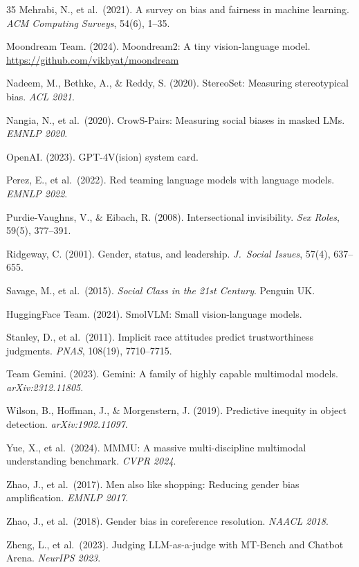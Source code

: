 \documentclass{article}
\begin{document}
\begin{thebibliography}{35}
Mehrabi, N., et al.\ (2021).
A survey on bias and fairness in machine learning.
\textit{ACM Computing Surveys}, 54(6), 1--35.

Moondream Team. (2024).
Moondream2: A tiny vision-language model.
\url{https://github.com/vikhyat/moondream}

Nadeem, M., Bethke, A., \& Reddy, S. (2020).
StereoSet: Measuring stereotypical bias.
\textit{ACL 2021}.

Nangia, N., et al.\ (2020).
CrowS-Pairs: Measuring social biases in masked LMs.
\textit{EMNLP 2020}.

OpenAI. (2023).
GPT-4V(ision) system card.

Perez, E., et al.\ (2022).
Red teaming language models with language models.
\textit{EMNLP 2022}.

Purdie-Vaughns, V., \& Eibach, R. (2008).
Intersectional invisibility.
\textit{Sex Roles}, 59(5), 377--391.

Ridgeway, C. (2001).
Gender, status, and leadership.
\textit{J.\ Social Issues}, 57(4), 637--655.

Savage, M., et al.\ (2015).
\textit{Social Class in the 21st Century}.
Penguin UK.

HuggingFace Team. (2024).
SmolVLM: Small vision-language models.

Stanley, D., et al.\ (2011).
Implicit race attitudes predict trustworthiness judgments.
\textit{PNAS}, 108(19), 7710--7715.

Team Gemini. (2023).
Gemini: A family of highly capable multimodal models.
\textit{arXiv:2312.11805}.

Wilson, B., Hoffman, J., \& Morgenstern, J. (2019).
Predictive inequity in object detection.
\textit{arXiv:1902.11097}.

Yue, X., et al.\ (2024).
MMMU: A massive multi-discipline multimodal understanding benchmark.
\textit{CVPR 2024}.

Zhao, J., et al.\ (2017).
Men also like shopping: Reducing gender bias amplification.
\textit{EMNLP 2017}.

Zhao, J., et al.\ (2018).
Gender bias in coreference resolution.
\textit{NAACL 2018}.

Zheng, L., et al.\ (2023).
Judging LLM-as-a-judge with MT-Bench and Chatbot Arena.
\textit{NeurIPS 2023}.

\end{thebibliography}
\end{document}
